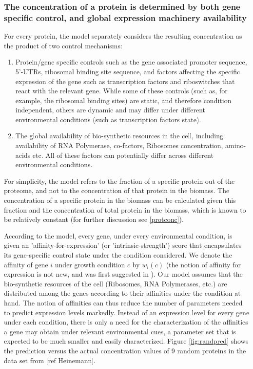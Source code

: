 \documentclass[notitlepage]{article}
\begin{document}
\subsubsection{The concentration of a protein is determined by both gene specific control, and global expression machinery availability}
For every protein, the model separately considers the resulting concentration as the product of two control mechanisms:
\begin{enumerate}
\item Protein/gene specific controls such as the gene associated promoter sequence, 5'-UTRs, ribosomal binding site sequence, and factors affecting the specific expression of the gene such as transcription factors and riboswitches that react with the relevant gene.
  While some of these controls (such as, for example, the ribosomal binding sites) are static, and therefore condition independent, others are dynamic and may differ under different environmental conditions (such as transcription factors state).
\item The global availability of bio-synthetic resources in the cell, including availability of RNA Polymerase, co-factors, Ribosomes concentration, amino-acids etc.
  All of these factors can potentially differ across different environmental conditions.
\end{enumerate}
For simplicity, the model refers to the fraction of a specific protein out of the proteome, and not to the concentration of that protein in the biomass.
The concentration of a specific protein in the biomass can be calculated given this fraction and the concentration of total protein in the biomass, which is known to be relatively constant \cite{eco-sal,Scott2014} (for further discussion see \ref{protconc}).

According to the model, every gene, under every environmental condition, is given an 'affinity-for-expression' (or 'intrinsic-strength') score that encapsulates its gene-specific control state under the condition considered.
We denote the affinity of gene $i$ under growth condition $c$ by $w_i(c)$ (the notion of affinity for expression is not new, and was first suggested in  \cite{Maaloe1969}).
Our model assumes that the bio-synthetic resources of the cell (Ribosomes, RNA Polymerases, etc.) are distributed among the genes according to their affinities under the condition at hand.
The notion of affinities can thus reduce the number of parameters needed to predict expression levels markedly.
Instead of an expression level for every gene under each condition, there is only a need for the characterization of the affinities a gene may obtain under relevant environmental cues, a parameter set that is expected to be much smaller and easily characterized.
Figure \ref{fig:randpred} shows the prediction versus the actual concentration values of 9 random proteins in the data set from [ref Heinemann].
\end{document}
